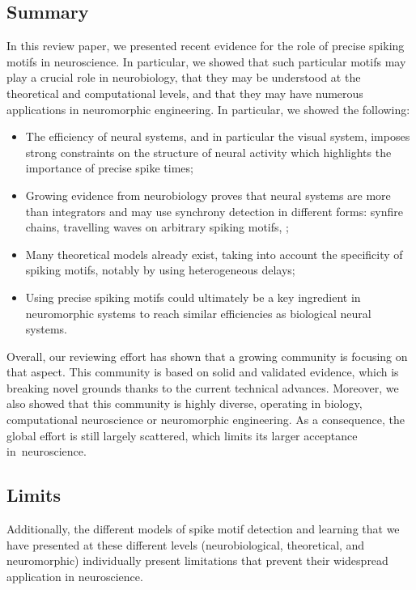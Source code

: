 \documentclass[brainsci, %
               review,accept,pdftex,moreauthors
               ]{Definitions/mdpi}
\begin{document}
\subsection{Summary}
In this review paper, we presented recent evidence for the role of precise spiking motifs in neuroscience. In particular, we showed that such particular motifs may play a crucial role in neurobiology, that they may be understood at the theoretical and computational levels, and that they may have numerous applications in neuromorphic engineering. In particular, we showed the following:
\begin{itemize}
  \item  The efficiency of neural systems, and in particular the visual system, imposes strong constraints on the structure of neural activity which highlights the importance of precise spike times;
  \item  Growing evidence from neurobiology proves that neural systems are more than integrators and may use synchrony detection in different forms: synfire chains, travelling waves on arbitrary spiking motifs, ;
  \item  Many theoretical models already exist, taking into account the specificity of spiking motifs, notably by using heterogeneous delays;
  \item  Using precise spiking motifs could ultimately be a key ingredient in neuromorphic systems to reach similar efficiencies as biological neural systems.
\end{itemize}

 Overall, our reviewing effort has shown that a growing community is focusing on that aspect. This community is based on solid and validated evidence, which is breaking novel grounds thanks to the current technical advances. Moreover, we also showed that this community is highly diverse, operating in biology, computational neuroscience or neuromorphic engineering. As a consequence, the global effort is still largely scattered, which limits its larger acceptance in~neuroscience. 

\subsection{Limits}
Additionally, the different models of spike motif detection and learning that we have presented at these different levels (neurobiological, theoretical, and neuromorphic) individually present limitations that prevent their widespread application in neuroscience.
\end{document}
